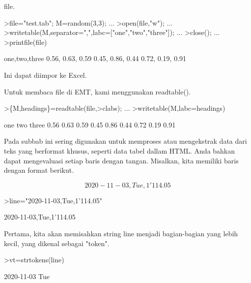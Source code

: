 \documentclass[a4paper,10pt]{article}
\begin{document}
\begin{eulernotebook}
\begin{eulercomment}
\begin{eulercomment}
\begin{eulercomment}
\begin{eulercomment}
\begin{eulercomment}
\begin{eulercomment}
\begin{eulercomment}
\begin{eulercomment}
\begin{eulercomment}
\begin{eulercomment}
\begin{eulercomment}
\begin{eulercomment}
\begin{eulercomment}
\begin{eulercomment}
\begin{eulercomment}
\begin{eulercomment}
\begin{eulercomment}
file.
\end{eulercomment}
\begin{eulerprompt}
>file="test.tab"; M=random(3,3);  ...
>open(file,"w");  ...
>writetable(M,separator=",",labc=["one","two","three"]);  ...
>close(); ...
>printfile(file)
\end{eulerprompt}
\begin{euleroutput}
  one,two,three
        0.56,      0.63,      0.59
        0.45,      0.86,      0.44
        0.72,      0.19,      0.91
\end{euleroutput}
\begin{eulercomment}
Ini dapat diimpor ke Excel.

Untuk membaca file di EMT, kami menggunakan readtable().
\end{eulercomment}
\begin{eulerprompt}
>\{M,headings\}=readtable(file,>clabs); ...
>writetable(M,labc=headings)
\end{eulerprompt}
\begin{euleroutput}
         one       two     three
        0.56      0.63      0.59
        0.45      0.86      0.44
        0.72      0.19      0.91
\end{euleroutput}
\begin{eulercomment}
Pada subbab ini sering digunakan untuk memproses atau mengekstrak data
dari teks yang berformat khusus, seperti data tabel dallam HTML. Anda
bahkan dapat mengevaluasi setiap baris dengan tangan. Misalkan, kita
memiliki baris dengan format berikut.\\
\end{eulercomment}
\begin{eulerformula}
\[
2020-11-03, Tue, 1'114.05
\]
\end{eulerformula}
\begin{eulerprompt}
>line="2020-11-03,Tue,1'114.05"
\end{eulerprompt}
\begin{euleroutput}
  2020-11-03,Tue,1'114.05
\end{euleroutput}
\begin{eulercomment}
Pertama, kita akan memisahkan string line menjadi bagian-bagian yang
lebih kecil, yang dikenal sebagai "token".
\end{eulercomment}
\begin{eulerprompt}
>vt=strtokens(line)
\end{eulerprompt}
\begin{euleroutput}
  2020-11-03
  Tue

\end{euleroutput}
\end{eulercomment}
\end{eulercomment}
\end{eulercomment}
\end{eulercomment}
\end{eulercomment}
\end{eulercomment}
\end{eulercomment}
\end{eulercomment}
\end{eulercomment}
\end{eulercomment}
\end{eulercomment}
\end{eulercomment}
\end{eulercomment}
\end{eulercomment}
\end{eulercomment}
\end{eulercomment}
\end{eulernotebook}
\end{document}
